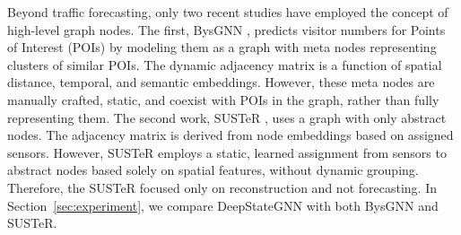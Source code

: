 Beyond traffic forecasting, only two recent studies have employed the concept of high-level graph nodes. The first, BysGNN \cite{Hajisafi23}, predicts visitor numbers for Points of Interest (POIs) by modeling them as a graph with meta nodes representing clusters of similar POIs. The dynamic adjacency matrix is a function of spatial distance, temporal, and semantic embeddings. However, these meta nodes are manually crafted, static, and coexist with POIs in the graph, rather than fully representing them.
The second work, SUSTeR \cite{woelker23}, uses a graph with only abstract nodes. The adjacency matrix is derived from node embeddings based on assigned sensors. However, SUSTeR employs a static, learned assignment from sensors to abstract nodes based solely on spatial features, without dynamic grouping.
Therefore, the SUSTeR focused only on reconstruction and not forecasting. In Section~\ref{sec:experiment}, we compare DeepStateGNN with both BysGNN and SUSTeR.



